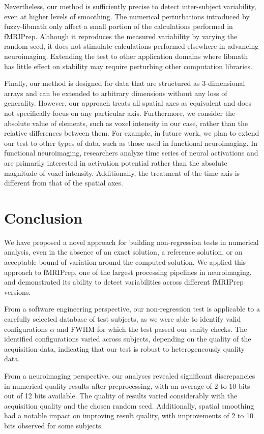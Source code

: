 \documentclass{article}
\newcommand{\fmriprep}{fMRIPrep\xspace}
\begin{document}
Nevertheless, our method is sufficiently precise to detect inter-subject
variability, even at higher levels of smoothing. The numerical perturbations
introduced by fuzzy-libmath only affect a small portion of the calculations
performed in \fmriprep. Although it reproduces the measured variability by
varying the random seed, it does not stimulate calculations performed elsewhere
in advancing neuroimaging. Extending the test to other application domains where
libmath has little effect on stability may require perturbing other computation
libraries.

Finally, our method is designed for data that are structured as 3-dimensional
arrays and can be extended to arbitrary dimensions without any loss of
generality. However, our approach treats all spatial axes as equivalent and does
not specifically focus on any particular axis. Furthermore, we consider the
absolute value of elements, such as voxel intensity in our case, rather than
the relative differences between them. For example, in future work, we plan to extend
our test to other types of data, such as those used in functional neuroimaging.
In functional neuroimaging, researchers analyze time series of neural
activations and are primarily interested in activation potential rather than the
absolute magnitude of voxel intensity. Additionally, the treatment of the time
axis is different from that of the spatial axes.

\section{Conclusion}

We have proposed a novel approach for building non-regression tests in numerical
analysis, even in the absence of an exact solution, a reference solution, or an
acceptable bound of variation around the computed solution. We applied this
approach to \fmriprep, one of the largest processing pipelines in neuroimaging,
and demonstrated its ability to detect variabilities across different \fmriprep
versions.

From a software engineering perspective, our non-regression test is applicable
to a carefully selected database of test subjects, as we were able to identify
valid configurations $\alpha$ and FWHM for which the test passed our sanity
checks. The identified configurations varied across subjects, depending on the
quality of the acquisition data, indicating that our test is robust to
heterogeneously quality data.

From a neuroimaging perspective, our analyses revealed significant discrepancies
in numerical quality results after preprocessing, with an average of 2 to 10
bits out of 12 bits available. The quality of results varied considerably with
the acquisition quality and the chosen random seed. Additionally, spatial
smoothing had a notable impact on improving result quality, with improvements of
2 to 10 bits observed for some subjects.
\end{document}
